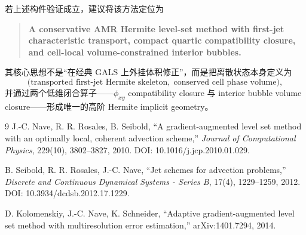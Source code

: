 \documentclass[11pt,a4paper]{ctexart}
\begin{document}
若上述构件验证成立，建议将该方法定位为
\begin{quote}
\textbf{A conservative AMR Hermite level-set method with first-jet characteristic transport, compact quartic compatibility closure, and cell-local volume-constrained interior bubbles.}
\end{quote}
其核心思想不是“在经典 GALS 上外挂体积修正”，而是把离散状态本身定义为
\begin{equation}
    \boxed{
    \bigl(\text{transported first-jet Hermite skeleton},\;
    \text{conserved cell phase volume}\bigr),
    }
\end{equation}
并通过两个低维闭合算子——$\phi_{xy}$ compatibility closure 与 interior bubble volume closure——形成唯一的高阶 Hermite implicit geometry。

\begin{thebibliography}{9}
J.-C. Nave, R. R. Rosales, B. Seibold,
``A gradient-augmented level set method with an optimally local, coherent advection scheme,''
\emph{Journal of Computational Physics}, 229(10), 3802--3827, 2010.
DOI: 10.1016/j.jcp.2010.01.029.

B. Seibold, R. R. Rosales, J.-C. Nave,
``Jet schemes for advection problems,''
\emph{Discrete and Continuous Dynamical Systems - Series B}, 17(4), 1229--1259, 2012.
DOI: 10.3934/dcdsb.2012.17.1229.

D. Kolomenskiy, J.-C. Nave, K. Schneider,
``Adaptive gradient-augmented level set method with multiresolution error estimation,''
arXiv:1401.7294, 2014.
\end{thebibliography}
\end{document}

